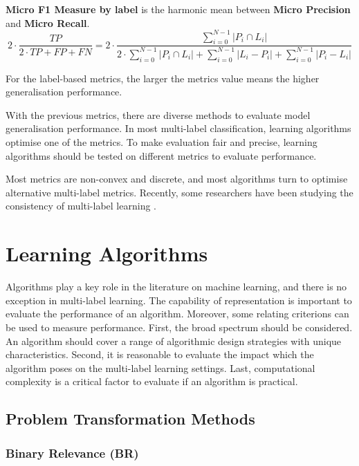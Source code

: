 \textbf{Micro F1 Measure by label} is the harmonic mean between \textbf{Micro Precision} and \textbf{Micro Recall}. 
\begin{equation}\label{eq:LabelMicroAccuracy}
2 \cdot \frac{TP}{2 \cdot TP + FP + FN}=2 \cdot \frac{\sum_{i=0}^{N-1} \left|P_i \cap L_i\right|}{2 \cdot
        \sum_{i=0}^{N-1} \left|P_i \cap L_i\right| + \sum_{i=0}^{N-1} \left|L_i - P_i\right| + \sum_{i=0}^{N-1}
        \left|P_i - L_i\right|}
\end{equation}

For the label-based metrics, the larger the metrics value means the higher generalisation performance.

With the previous metrics, there are diverse methods to evaluate model generalisation performance. In most multi-label classification, learning algorithms optimise one of the metrics. To make evaluation fair and precise, learning algorithms should be tested on different metrics to evaluate performance.

Most metrics are non-convex and discrete, and most algorithms turn to optimise alternative multi-label metrics. Recently, some researchers have been studying the consistency of multi-label learning \citep{gao2013consistency}. 

\section{Learning Algorithms}

Algorithms play a key role in the literature on machine learning, and there is no exception in multi-label learning. The capability of representation is important to evaluate the performance of an algorithm. Moreover, some relating criterions can be used to measure performance. First, the broad spectrum should be considered. An algorithm should cover a range of algorithmic design strategies with unique characteristics. Second, it is reasonable to evaluate the impact which the algorithm poses on the multi-label learning settings. Last, computational complexity is a critical factor to evaluate if an algorithm is practical.

\subsection{Problem Transformation Methods}

\subsubsection{Binary Relevance (BR)}

